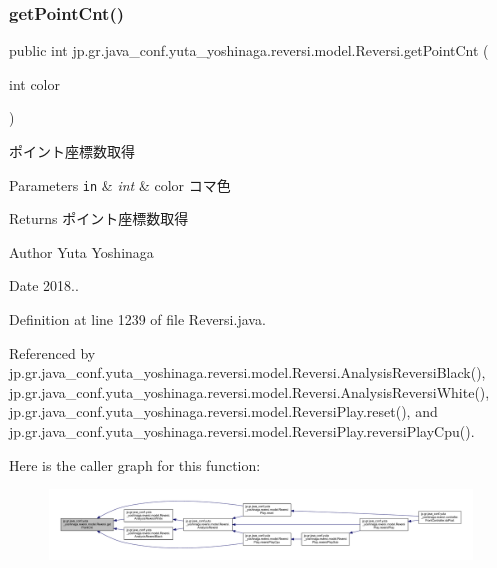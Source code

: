 \subsubsection{\texorpdfstring{get\+Point\+Cnt()}{getPointCnt()}}
{\footnotesize\ttfamily public int jp.\+gr.\+java\+\_\+conf.\+yuta\+\_\+yoshinaga.\+reversi.\+model.\+Reversi.\+get\+Point\+Cnt (\begin{DoxyParamCaption}\item[{int}]{color }\end{DoxyParamCaption})}



ポイント座標数取得 


\begin{DoxyParams}[1]{Parameters}
\mbox{\tt in}  & {\em int} & color コマ色 \\
\hline
\end{DoxyParams}
\begin{DoxyReturn}{Returns}
ポイント座標数取得 
\end{DoxyReturn}
\begin{DoxyAuthor}{Author}
Yuta Yoshinaga 
\end{DoxyAuthor}
\begin{DoxyDate}{Date}
2018.. 
\end{DoxyDate}


Definition at line 1239 of file Reversi.\+java.



Referenced by jp.\+gr.\+java\+\_\+conf.\+yuta\+\_\+yoshinaga.\+reversi.\+model.\+Reversi.\+Analysis\+Reversi\+Black(), jp.\+gr.\+java\+\_\+conf.\+yuta\+\_\+yoshinaga.\+reversi.\+model.\+Reversi.\+Analysis\+Reversi\+White(), jp.\+gr.\+java\+\_\+conf.\+yuta\+\_\+yoshinaga.\+reversi.\+model.\+Reversi\+Play.\+reset(), and jp.\+gr.\+java\+\_\+conf.\+yuta\+\_\+yoshinaga.\+reversi.\+model.\+Reversi\+Play.\+reversi\+Play\+Cpu().

Here is the caller graph for this function\+:\nopagebreak
\begin{figure}[H]
\begin{center}
\leavevmode
\includegraphics[width=350pt]{classjp_1_1gr_1_1java__conf_1_1yuta__yoshinaga_1_1reversi_1_1model_1_1_reversi_a8ab289d67a725a30e92411c90b755bd8_icgraph}
\end{center}
\end{figure}
\mbox{\label{classjp_1_1gr_1_1java__conf_1_1yuta__yoshinaga_1_1reversi_1_1model_1_1_reversi_a9929ed36140ddc25923ede99f86564c3}} 
